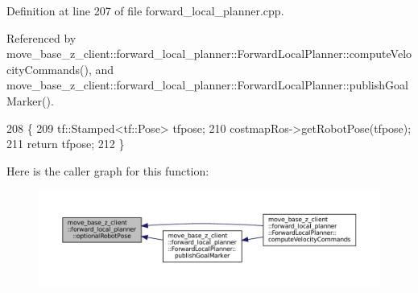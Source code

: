 Definition at line 207 of file forward\+\_\+local\+\_\+planner.\+cpp.



Referenced by move\+\_\+base\+\_\+z\+\_\+client\+::forward\+\_\+local\+\_\+planner\+::\+Forward\+Local\+Planner\+::compute\+Velocity\+Commands(), and move\+\_\+base\+\_\+z\+\_\+client\+::forward\+\_\+local\+\_\+planner\+::\+Forward\+Local\+Planner\+::publish\+Goal\+Marker().


\begin{DoxyCode}
208 \{
209     tf::Stamped<tf::Pose> tfpose;
210     costmapRos->getRobotPose(tfpose);
211     \textcolor{keywordflow}{return} tfpose;
212 \}
\end{DoxyCode}
Here is the caller graph for this function\+:
\nopagebreak
\begin{figure}[H]
\begin{center}
\leavevmode
\includegraphics[width=350pt]{namespacemove__base__z__client_1_1forward__local__planner_a683a39a154ed5aa179fdb1afb7bfe2e4_icgraph}
\end{center}
\end{figure}
